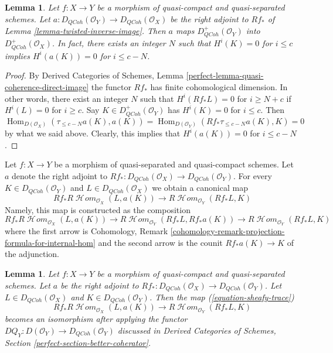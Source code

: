 \documentclass{stacks-project}
\theoremstyle{plain}
\newtheorem{lemma}[subsection]{Lemma}
\theoremstyle{definition}
\theoremstyle{remark}
\numberwithin{equation}{subsection}
\def\Hom{\mathop{\mathrm{Hom}}\nolimits}
\def\SheafHom{\mathop{\mathcal{H}\!\mathit{om}}\nolimits}
\def\QCoh{\mathit{QCoh}}
\begin{document}
\begin{lemma}
\label{lemma-twisted-inverse-image-bounded-below}
Let $f : X \to Y$ be a morphism of quasi-compact and quasi-separated
schemes. Let $a : D_\QCoh(\mathcal{O}_Y) \to D_\QCoh(\mathcal{O}_X)$
be the right adjoint to $Rf_*$ of Lemma \ref{lemma-twisted-inverse-image}.
Then $a$ maps $D^+_\QCoh(\mathcal{O}_Y)$ into $D^+_\QCoh(\mathcal{O}_X)$.
In fact, there exists an integer $N$ such that
$H^i(K) = 0$ for $i \leq c$ implies $H^i(a(K)) = 0$ for $i \leq c - N$.
\end{lemma}

\begin{proof}
By Derived Categories of Schemes, Lemma
\ref{perfect-lemma-quasi-coherence-direct-image}
the functor $Rf_*$ has finite cohomological dimension. In other words,
there exist an integer $N$ such that
$H^i(Rf_*L) = 0$ for $i \geq N + c$ if $H^i(L) = 0$ for $i \geq c$.
Say $K \in D^+_\QCoh(\mathcal{O}_Y)$ has $H^i(K) = 0$ for $i \leq c$.
Then
$$
\Hom_{D(\mathcal{O}_X)}(\tau_{\leq c - N}a(K), a(K)) =
\Hom_{D(\mathcal{O}_Y)}(Rf_*\tau_{\leq c - N}a(K), K) = 0
$$
by what we said above. Clearly, this implies that
$H^i(a(K)) = 0$ for $i \leq c - N$.
\end{proof}

\noindent
Let $f : X \to Y$ be a morphism of quasi-separated and quasi-compact
schemes. Let $a$ denote the right adjoint to
$Rf_* : D_\QCoh(\mathcal{O}_X) \to D_\QCoh(\mathcal{O}_Y)$. For every
$K \in D_\QCoh(\mathcal{O}_Y)$ and $L \in D_\QCoh(\mathcal{O}_X)$
we obtain a canonical map
\begin{equation}
\label{equation-sheafy-trace}
Rf_*R\SheafHom_{\mathcal{O}_X}(L, a(K))
\longrightarrow
R\SheafHom_{\mathcal{O}_Y}(Rf_*L, K)
\end{equation}
Namely, this map is constructed as the composition
$$
Rf_*R\SheafHom_{\mathcal{O}_X}(L, a(K)) \to
R\SheafHom_{\mathcal{O}_Y}(Rf_*L, Rf_*a(K)) \to
R\SheafHom_{\mathcal{O}_Y}(Rf_*L, K)
$$
where the first arrow is 
Cohomology, Remark
\ref{cohomology-remark-projection-formula-for-internal-hom}
and the second arrow is the counit $Rf_*a(K) \to K$ of the adjunction.

\begin{lemma}
\label{lemma-iso-on-RSheafHom}
Let $f : X \to Y$ be a morphism of quasi-compact and quasi-separated schemes.
Let $a$ be the right adjoint to
$Rf_* : D_\QCoh(\mathcal{O}_X) \to D_\QCoh(\mathcal{O}_Y)$.
Let $L \in D_\QCoh(\mathcal{O}_X)$ and $K \in D_\QCoh(\mathcal{O}_Y)$.
Then the map (\ref{equation-sheafy-trace})
$$
Rf_*R\SheafHom_{\mathcal{O}_X}(L, a(K))
\longrightarrow
R\SheafHom_{\mathcal{O}_Y}(Rf_*L, K)
$$
becomes an isomorphism after applying the functor
$DQ_Y : D(\mathcal{O}_Y) \to D_\QCoh(\mathcal{O}_Y)$
discussed in Derived Categories of Schemes, Section
\ref{perfect-section-better-coherator}.
\end{lemma}
\end{document}
